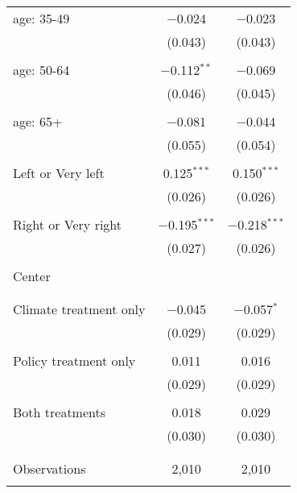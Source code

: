 \begin{tabular}{@{\extracolsep{5pt}}lcc}
 age: 35-49 & $-$0.024 & $-$0.023 \\ 
  & (0.043) & (0.043) \\ 
  & & \\ 
 age: 50-64 & $-$0.112$^{**}$ & $-$0.069 \\ 
  & (0.046) & (0.045) \\ 
  & & \\ 
 age: 65+ & $-$0.081 & $-$0.044 \\ 
  & (0.055) & (0.054) \\ 
  & & \\ 
 Left or Very left & 0.125$^{***}$ & 0.150$^{***}$ \\ 
  & (0.026) & (0.026) \\ 
  & & \\ 
 Right or Very right & $-$0.195$^{***}$ & $-$0.218$^{***}$ \\ 
  & (0.027) & (0.026) \\ 
  & & \\ 
 Center &  &  \\ 
  &  &  \\ 
  & & \\ 
 Climate treatment only & $-$0.045 & $-$0.057$^{*}$ \\ 
  & (0.029) & (0.029) \\ 
  & & \\ 
 Policy treatment only & 0.011 & 0.016 \\ 
  & (0.029) & (0.029) \\ 
  & & \\ 
 Both treatments & 0.018 & 0.029 \\ 
  & (0.030) & (0.030) \\ 
  & & \\ 
\hline \\[-1.8ex] 

Observations & 2,010 & 2,010 \\ 
\hline 
\hline \\[-1.8ex] 
\end{tabular} 